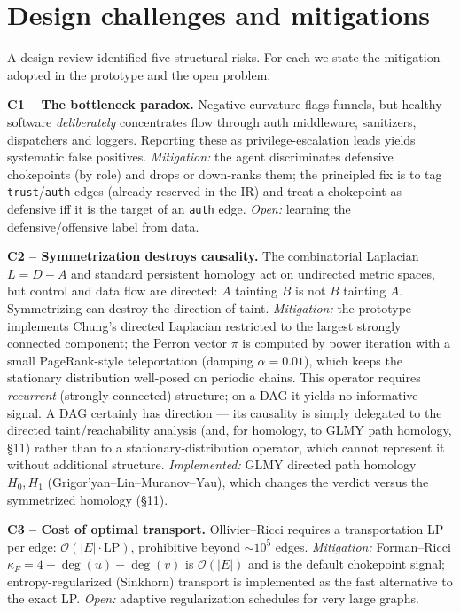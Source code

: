 \documentclass[11pt]{article}
\begin{document}
\section{Design challenges and mitigations}
A design review identified five structural risks. For each we state the
mitigation adopted in the prototype and the open problem.

\textbf{C1 -- The bottleneck paradox.} Negative curvature flags funnels, but
healthy software \emph{deliberately} concentrates flow through auth middleware,
sanitizers, dispatchers and loggers. Reporting these as privilege-escalation
leads yields systematic false positives. \emph{Mitigation:} the agent
discriminates defensive chokepoints (by role) and drops or down-ranks them; the
principled fix is to tag \texttt{trust}/\texttt{auth} edges (already reserved in
the IR) and treat a chokepoint as defensive iff it is the target of an
\texttt{auth} edge. \emph{Open:} learning the defensive/offensive label from data.

\textbf{C2 -- Symmetrization destroys causality.} The combinatorial Laplacian
$L=D-A$ and standard persistent homology act on undirected metric spaces, but
control and data flow are directed: $A$ tainting $B$ is not $B$ tainting $A$.
Symmetrizing can destroy the direction of taint. \emph{Mitigation:} the
prototype implements Chung's directed Laplacian restricted to the largest
strongly connected component; the Perron vector $\pi$ is computed by power
iteration with a small PageRank-style teleportation (damping $\alpha = 0.01$),
which keeps the stationary distribution well-posed on periodic chains. This
operator requires \emph{recurrent} (strongly connected) structure; on a DAG it
yields no informative signal. A DAG certainly has direction --- its causality is
simply delegated to the directed taint/reachability analysis (and, for homology,
to GLMY path homology, \S11) rather than to a stationary-distribution operator,
which cannot represent it without additional structure.
\emph{Implemented:} GLMY directed path homology $H_0,H_1$
(Grigor'yan--Lin--Muranov--Yau), which changes the verdict versus the
symmetrized homology (\S11).

\textbf{C3 -- Cost of optimal transport.} Ollivier--Ricci requires a
transportation LP per edge: $\mathcal{O}(|E|\cdot\text{LP})$, prohibitive beyond
$\sim 10^5$ edges. \emph{Mitigation:} Forman--Ricci
$\kappa_F = 4 - \deg(u) - \deg(v)$ is $\mathcal{O}(|E|)$ and is the default
chokepoint signal; entropy-regularized (Sinkhorn) transport is implemented as the
fast alternative to the exact LP. \emph{Open:} adaptive regularization
schedules for very large graphs.
\end{document}
